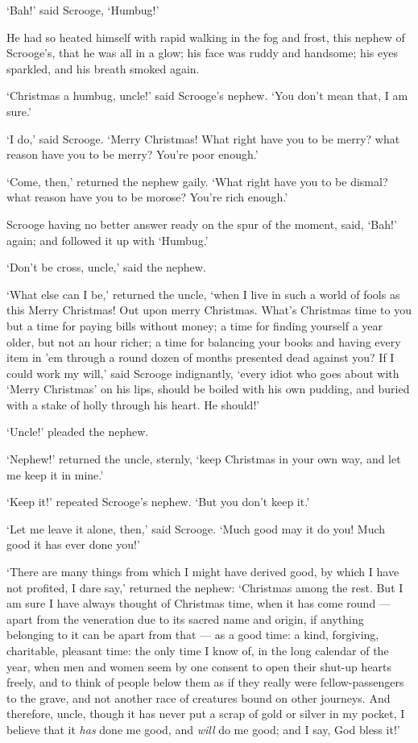 \documentclass[11pt,twoside]{article}\makeatletter
\begin{document}
‘Bah!’ said Scrooge, ‘Humbug!’\par
He had so heated himself with rapid walking in the fog and frost, this nephew of Scrooge's, that he was all in a glow; his face was ruddy and handsome; his eyes sparkled, and his breath smoked again. \par
‘Christmas a humbug, uncle!’ said Scrooge's nephew. ‘You don't mean that, I am sure.’\par
‘I do,’ said Scrooge. ‘Merry Christmas! What right have you to be merry? what reason have you to be merry? You're poor enough.’\par
‘Come, then,’ returned the nephew gaily. ‘What right have you to be dismal? what reason have you to be morose? You're rich enough.’\par
Scrooge having no better answer ready on the spur of the moment, said, ‘Bah!’ again; and followed it up with ‘Humbug.’\par
‘Don't be cross, uncle,’ said the nephew.\par
‘What else can I be,’ returned the uncle, ‘when I live in such a world of fools as this Merry Christmas! Out upon merry Christmas. What's Christmas time to you but a time for paying bills without money; a time for finding yourself a year older, but not an hour richer; a time for balancing your books and having every item in 'em through a round dozen of months presented dead against you? If I could work my will,’ said Scrooge indignantly, ‘every idiot who goes about with ‘Merry Christmas’ on his lips, should be boiled with his own pudding, and buried with a stake of holly through his heart. He should!’\par
‘Uncle!’ pleaded the nephew.\par
‘Nephew!’ returned the uncle, sternly, ‘keep Christmas in your own way, and let me keep it in mine.’\par
‘Keep it!’ repeated Scrooge's nephew. ‘But you don't keep it.’\par
‘Let me leave it alone, then,’ said Scrooge. ‘Much good may it do you! Much good it has ever done you!’\par
‘There are many things from which I might have derived good, by which I have not profited, I dare say,’ returned the nephew: ‘Christmas among the rest. But I am sure I have always thought of Christmas time, when it has come round — apart from the veneration due to its sacred name and origin, if anything belonging to it can be apart from that — as a good time: a kind, forgiving, charitable, pleasant time: the only time I know of, in the long calendar of the year, when men and women seem by one consent to open their shut-up hearts freely, and to think of people below them as if they really were fellow-passengers to the grave, and not another race of creatures bound on other journeys. And therefore, uncle, though it has never put a scrap of gold or silver in my pocket, I believe that it \textit{has} done me good, and \textit{will} do me good; and I say, God bless it!’\par
\end{document}
